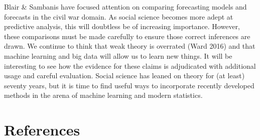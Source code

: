 \documentclass[
]{article}
\begin{document}
Blair \& Sambanis have focused attention on comparing forecasting models and forecasts in the civil war domain. As social science becomes more adept at predictive analysis, this will doubtless be of increasing importance. However, these comparisons must be made carefully to ensure those correct inferences are drawn. We continue to think that weak theory is overrated (Ward 2016) and that machine learning and big data will allow us to learn new things. It will be interesting to see how the evidence for these claims is adjudicated with additional usage and careful evaluation. Social science has leaned on theory for (at least) seventy years, but it is time to find useful ways to incorporate recently developed methods in the arena of machine learning and modern statistics.

\newpage

\hypertarget{references}{%
\section{References}\label{references}}
\end{document}
